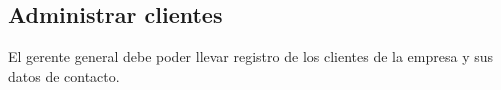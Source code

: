 \documentclass[a4paper, 12pt,twoside]{report}  %
\numberwithin{equation}{subsection} %
\begin{document}
\indent
\\\\\\\\\\\\\\\\\\\\\\\\
\\\\\\\\\\\\\\\\\\\\
\pagebreak

\subsection*{Administrar clientes}
El gerente general debe poder llevar registro de los clientes de la empresa y sus datos de contacto.

\renewcommand{\arraystretch}{1.4}
\end{document}
